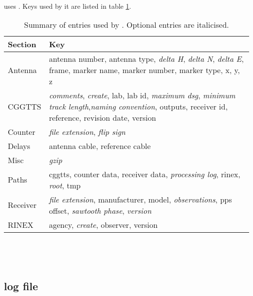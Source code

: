  uses .
Keys used by it are listed in table \ref{t:gpscvKeys}.

\begin{table}
\begin{tabular}{l|p{10cm}}
Section & Key \\ \hline
Antenna & antenna number, antenna type, \textit{delta H}, \textit{delta N},
         \textit{delta E}, frame, marker name, marker number, marker type, 
         x, y, z \\ \hline
CGGTTS  & \textit{comments}, \textit{create}, lab, lab id, 
         \textit{maximum dsg}, \textit{minimum track length},\textit{naming convention},
         outputs, receiver id, reference, revision date, version\\
Counter & \textit{file extension}, \textit{flip sign}\\ \hline
Delays  &  antenna cable, reference cable\\
Misc & \textit{gzip}\\
Paths & cggtts, counter data, receiver data, \textit{processing log},
        rinex, \textit{root}, tmp\\
Receiver & \textit{file extension}, manufacturer, model,
          \textit{observations}, pps offset, \textit{sawtooth phase},
          \textit{version}\\ \hline
RINEX & agency, \textit{create}, observer, version\\
\end{tabular}
\caption{Summary of  entries used by . Optional entries are italicised. \label{t:gpscvKeys}}
\end{table}

\begin{lstlisting}




\end{lstlisting}

\subsection{log file}
